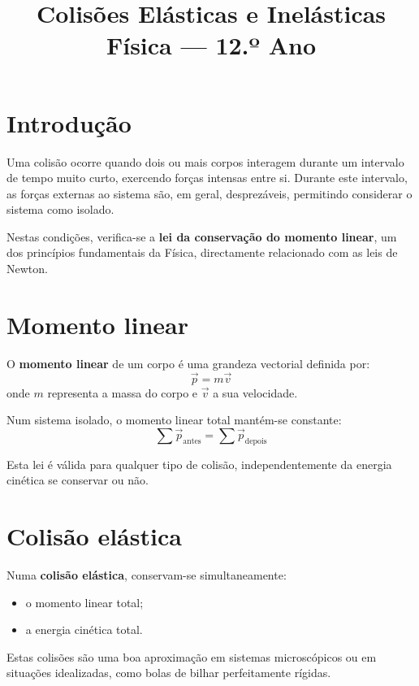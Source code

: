 \documentclass[12pt,a4paper]{article}
\title{\textbf{Colisões Elásticas e Inelásticas}\\
	Física — 12.º Ano}
\author{}
\date{}
\begin{document}
	\maketitle
	
	\section{Introdução}
	
	Uma colisão ocorre quando dois ou mais corpos interagem durante um intervalo de tempo muito curto, exercendo forças intensas entre si. Durante este intervalo, as forças externas ao sistema são, em geral, desprezáveis, permitindo considerar o sistema como isolado.
	
	Nestas condições, verifica-se a \textbf{lei da conservação do momento linear}, um dos princípios fundamentais da Física, directamente relacionado com as leis de Newton.
	
	\section{Momento linear}
	
	O \textbf{momento linear} de um corpo é uma grandeza vectorial definida por:
	\[
	\vec{p} = m \vec{v}
	\]
	onde \(m\) representa a massa do corpo e \(\vec{v}\) a sua velocidade.
	
	Num sistema isolado, o momento linear total mantém-se constante:
	\[
	\sum \vec{p}_{\text{antes}} = \sum \vec{p}_{\text{depois}}
	\]
	
	Esta lei é válida para qualquer tipo de colisão, independentemente da energia cinética se conservar ou não.
	
	\section{Colisão elástica}
	
	Numa \textbf{colisão elástica}, conservam-se simultaneamente:
	\begin{itemize}
		\item o momento linear total;
		\item a energia cinética total.
	\end{itemize}
	
	Estas colisões são uma boa aproximação em sistemas microscópicos ou em situações idealizadas, como bolas de bilhar perfeitamente rígidas.
	
\end{document}
